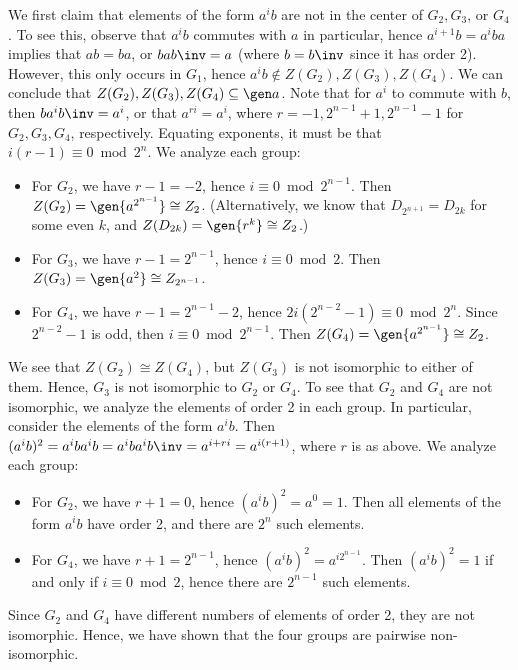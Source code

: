 \begin{sol}
    We first claim that elements of the form $a^ib$ are not in the center of $G_2, G_3$, or $G_4$. To see this, observe that $a^ib$ commutes with $a$ in particular, hence $a^{i + 1}b = a^iba$ implies that $ab = ba$, or $bab\inv = a$ (where $b = b\inv$ since it has order 2). However, this only occurs in $G_1$, hence $a^ib \notin Z(G_2), Z(G_3), Z(G_4)$. We can conclude that $Z(G_2), Z(G_3), Z(G_4) \subseteq \gen a$. Note that for $a^i$ to commute with $b$, then $ba^ib\inv = a^i$, or that $a^{ri} = a^i$, where $r = -1, 2^{n - 1} + 1, 2^{n - 1} - 1$ for $G_2, G_3, G_4$, respectively. Equating exponents, it must be that $i(r - 1) \equiv 0 \bmod 2^n$. We analyze each group:
    \begin{itemize}
        \item For $G_2$, we have $r - 1 = -2$, hence $i \equiv 0 \bmod 2^{n - 1}$. Then $Z(G_2) = \gen{a^{2^{n - 1}}} \cong Z_2$. (Alternatively, we know that $D_{2^{n + 1}} = D_{2k}$ for some even $k$, and $Z(D_{2k}) = \gen{r^k} \cong Z_2$.)
        \item For $G_3$, we have $r - 1 = 2^{n - 1}$, hence $i \equiv 0 \bmod 2$. Then $Z(G_3) = \gen{a^2} \cong Z_{2^{n - 1}}$.
        \item For $G_4$, we have $r - 1 = 2^{n - 1} - 2$, hence $2i(2^{n - 2} - 1) \equiv 0 \bmod 2^n$. Since $2^{n - 2} - 1$ is odd, then $i \equiv 0 \bmod 2^{n - 1}$. Then $Z(G_4) = \gen{a^{2^{n - 1}}} \cong Z_2$.
    \end{itemize}
    We see that $Z(G_2) \cong Z(G_4)$, but $Z(G_3)$ is not isomorphic to either of them. Hence, $G_3$ is not isomorphic to $G_2$ or $G_4$. To see that $G_2$ and $G_4$ are not isomorphic, we analyze the elements of order 2 in each group. In particular, consider the elements of the form $a^ib$. Then $(a^ib)^2 = a^iba^ib = a^iba^ib\inv = a^{i + ri} = a^{i(r + 1)}$, where $r$ is as above. We analyze each group:
    \begin{itemize}
        \item For $G_2$, we have $r + 1 = 0$, hence $(a^ib)^2 = a^0 = 1$. Then all elements of the form $a^ib$ have order 2, and there are $2^n$ such elements.
        \item For $G_4$, we have $r + 1 = 2^{n - 1}$, hence $(a^ib)^2 = a^{i2^{n - 1}}$. Then $(a^ib)^2 = 1$ if and only if $i \equiv 0 \bmod 2$, hence there are $2^{n - 1}$ such elements.
    \end{itemize}
    Since $G_2$ and $G_4$ have different numbers of elements of order 2, they are not isomorphic. Hence, we have shown that the four groups are pairwise non-isomorphic.
\end{sol}

